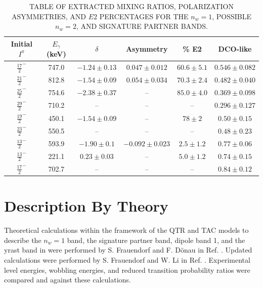 \begin{table}
\begin{center}
\caption{TABLE OF EXTRACTED MIXING RATIOS, POLARIZATION ASYMMETRIES, AND $E2$ PERCENTAGES FOR THE $n_w=1$, POSSIBLE $n_w=2$, AND SIGNATURE PARTNER BANDS.\label{tbl:chp4-mixing-asym}}
\begin{tabular}{|c|c|c|c|c|c|}
\hline
\hline
Initial $I^\pi{}$ &$E_{\gamma}$ (keV) &$\delta$ & Asymmetry & \% E2 & DCO-like\\
\hline
$\frac{17}{2}^-$ & 747.0 & $-1.24\pm0.13$ & $0.047\pm0.012$ & $60.6\pm5.1$ & $0.546\pm0.082$\\
$\frac{21}{2}^-$ & 812.8 & $-1.54\pm0.09$ & $0.054\pm0.034$ & $70.3\pm2.4$ & $0.482\pm0.040$\\
$\frac{25}{2}^-$ & 754.6 & $-2.38\pm0.37$ & -- & $85.0\pm4.0$ & $0.369\pm0.098$\\
$\frac{29}{2}^-$ & 710.2 & -- & -- & -- & $0.296\pm0.127$\\
\hline
$\frac{19}{2}^-$ & 450.1 & $-1.54\pm0.09$ & -- & $78\pm2$ & $0.50\pm0.15$\\
$\frac{23}{2}^-$ & 550.5 & -- & -- & -- & $0.48\pm0.23$\\
\hline
$\frac{13}{2}^-$ & 593.9 & $-1.90\pm0.1$ & $-0.092\pm{}0.023$ & $2.5\pm1.2$ & $0.77\pm0.06$\\
$\frac{13}{2}^-$ & 221.1 & $0.23\pm0.03$ & -- & $5.0\pm1.2$ & $0.74\pm0.15$\\
$\frac{17}{2}^-$ & 702.7 & -- & -- & -- & $0.84\pm0.12$\\
\hline
\hline\end{tabular}
\end{center}
\end{table}

\section{Description By Theory}
\label{sec:trw-theory-desc}
Theoretical calculations within the framework of the QTR and TAC models to describe the $n_w=1$ band, the signature partner band, dipole band 1, and the yrast band in \pr{} were performed by S. Frauendorf and F. D\"onau in Ref. \cite{frauendorfTransverseWobbling}. Updated calculations were performed by S. Frauendorf and W. Li in Ref. \cite{mattaTransversePRL}. Experimental level energies, wobbling energies, and reduced transition probability ratios were compared and against these calculations.

